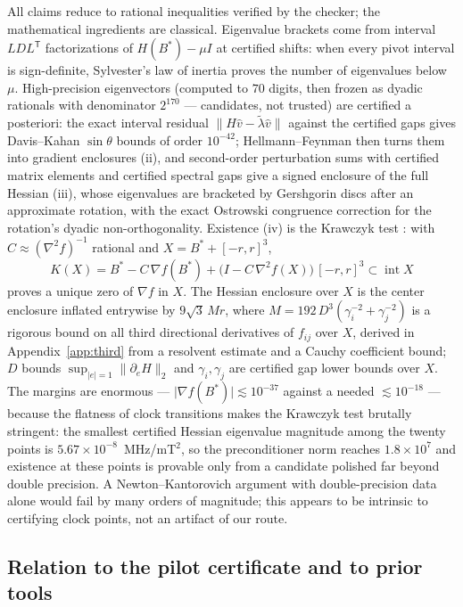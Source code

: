 \documentclass[11pt]{amsart}
\theoremstyle{plain}
\theoremstyle{definition}
\theoremstyle{remark}
\begin{document}
All claims reduce to rational inequalities verified by the checker; the
mathematical ingredients are classical.  Eigenvalue brackets come from
interval $LDL^{\mathsf T}$ factorizations of $H(B^*)-\mu I$ at certified
shifts: when every pivot interval is sign-definite, Sylvester's law of inertia
proves the number of eigenvalues below $\mu$.  High-precision eigenvectors
(computed to $70$ digits, then frozen as dyadic rationals with denominator
$2^{170}$ --- candidates, not trusted) are certified a posteriori: the exact
interval residual $\|H\hat v-\tilde\lambda\hat v\|$ against the certified gaps
gives Davis--Kahan $\sin\theta$ bounds \cite{DavisKahan} of order $10^{-42}$;
Hellmann--Feynman then turns them into gradient enclosures (ii), and
second-order perturbation sums with certified matrix elements and certified
spectral gaps give a signed enclosure of the full Hessian (iii), whose
eigenvalues are bracketed by Gershgorin discs after an approximate rotation,
with the exact Ostrowski congruence correction \cite[Thm.~4.5.9]{HornJohnson}
for the rotation's dyadic non-orthogonality.  Existence (iv) is the Krawczyk
test \cite{Krawczyk,Neumaier}: with $C\approx(\nabla^2f)^{-1}$ rational and
$X=B^*+[-r,r]^3$,
\[
K(X)=B^*-C\,\nabla f(B^*)+\bigl(I-C\,\nabla^2 f(X)\bigr)\,[-r,r]^3
\subset\operatorname{int}X
\]
proves a unique zero of $\nabla f$ in $X$.  The Hessian enclosure over $X$ is
the center enclosure inflated entrywise by $9\sqrt3\,Mr$, where
$M=192\,D^3(\gamma_i^{-2}+\gamma_j^{-2})$ is a rigorous bound on all third
directional derivatives of $f_{ij}$ over $X$, derived in
Appendix~\ref{app:third} from a resolvent estimate and a Cauchy coefficient
bound; $D$ bounds $\sup_{|e|=1}\|\partial_e H\|_2$ and $\gamma_{i},\gamma_j$
are certified gap lower bounds over $X$.  The margins are enormous ---
$\lvert\nabla f(B^*)\rvert\lesssim10^{-37}$ against a needed
$\lesssim10^{-18}$ --- because the flatness of clock transitions makes the
Krawczyk test brutally stringent: the smallest certified Hessian eigenvalue
magnitude among the twenty points is $5.67\times10^{-8}$~MHz/mT$^2$, so the
preconditioner norm reaches $1.8\times10^{7}$ and existence at these points is
provable only from a candidate polished far beyond double precision.  A
Newton--Kantorovich argument with double-precision data alone would fail by
many orders of magnitude; this appears to be intrinsic to certifying clock
points, not an artifact of our route.

\subsection{Relation to the pilot certificate and to prior tools}
\end{document}
